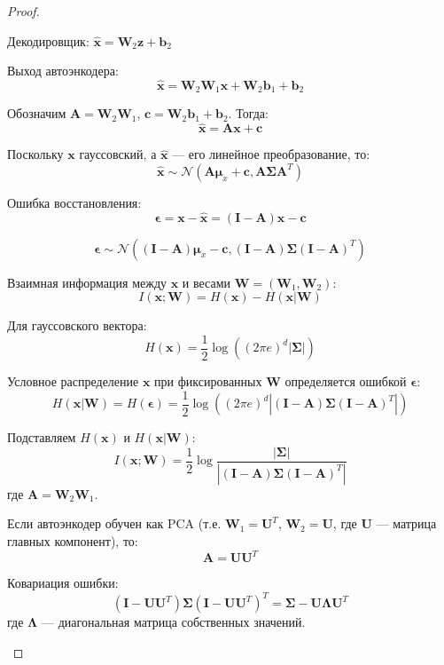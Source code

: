 \documentclass[a4paper, 14pt]{article}
\begin{document}
\begin{proof}
\begin{enumerate}
Декодировщик: $\mathbf{\hat{x}} = \mathbf{W}_2 \mathbf{z} + \mathbf{b}_2$

Выход автоэнкодера: 
\[\mathbf{\hat{x}} = \mathbf{W}_2 \mathbf{W}_1 \mathbf{x} + \mathbf{W}_2\mathbf{b}_1 + \mathbf{b}_2\]  

Обозначим $\mathbf{A} = \mathbf{W}_2 \mathbf{W}_1$, $\mathbf{c} = \mathbf{W}_2 \mathbf{b}_1 + \mathbf{b}_2$. Тогда:
\[\mathbf{\hat{x}} = \mathbf{A} \mathbf{x} + \mathbf{c}\]  

Поскольку $\mathbf{x}$ гауссовский, а $\mathbf{\hat{x}}$ — его линейное преобразование, то:
\[\mathbf{\hat{x}} \sim \mathcal{N}(\mathbf{A} \boldsymbol{\mu}_x + \mathbf{c}, \mathbf{A} \boldsymbol{\Sigma} \mathbf{A}^T)\]  

Ошибка восстановления:  
\[\boldsymbol{\epsilon} = \mathbf{x} - \mathbf{\hat{x}} = (\mathbf{I} - \mathbf{A}) \mathbf{x} - \mathbf{c}\]  

\[\boldsymbol{\epsilon} \sim \mathcal{N}\left( (\mathbf{I} - \mathbf{A}) \boldsymbol{\mu}_x - \mathbf{c}, (\mathbf{I} - \mathbf{A}) \boldsymbol{\Sigma} (\mathbf{I} - \mathbf{A})^T \right)\]  

Взаимная информация между $\mathbf{x}$ и весами $\mathbf{W} = (\mathbf{W}_1, \mathbf{W}_2)$:
\[I(\mathbf{x}; \mathbf{W}) = H(\mathbf{x}) - H(\mathbf{x} | \mathbf{W})\]  

Для гауссовского вектора:  
\[H(\mathbf{x}) = \frac{1}{2} \log \left( (2\pi e)^d |\boldsymbol{\Sigma}| \right)\]  

Условное распределение $\mathbf{x}$ при фиксированных $\mathbf{W}$ определяется ошибкой $\boldsymbol{\epsilon}$:  
\[H(\mathbf{x} | \mathbf{W}) = H(\boldsymbol{\epsilon}) = \frac{1}{2} \log \left( (2\pi e)^d |(\mathbf{I} - \mathbf{A}) \boldsymbol{\Sigma} (\mathbf{I} - \mathbf{A})^T| \right)\]  

Подставляем $H(\mathbf{x})$ и $H(\mathbf{x}|\mathbf{W})$:  
\[I(\mathbf{x}; \mathbf{W}) = \frac{1}{2} \log \frac{|\boldsymbol{\Sigma}|}{|(\mathbf{I} - \mathbf{A}) \boldsymbol{\Sigma} (\mathbf{I} - \mathbf{A})^T|}\]  
\noindent где $\mathbf{A} = \mathbf{W}_2 \mathbf{W}_1$.  

Если автоэнкодер обучен как PCA (т.е. $\mathbf{W}_1 = \mathbf{U}^T$, $\mathbf{W}_2 = \mathbf{U}$, где $\mathbf{U}$ — матрица главных компонент), то:  
\[\mathbf{A} = \mathbf{U} \mathbf{U}^T\]  

Ковариация ошибки:  
\[(\mathbf{I} - \mathbf{U} \mathbf{U}^T) \boldsymbol{\Sigma} (\mathbf{I} - \mathbf{U} \mathbf{U}^T)^T = \boldsymbol{\Sigma} - \mathbf{U} \mathbf{\Lambda} \mathbf{U}^T\]  
где $\mathbf{\Lambda}$ — диагональная матрица собственных значений.  


\end{enumerate}
\end{proof}
\end{document}
